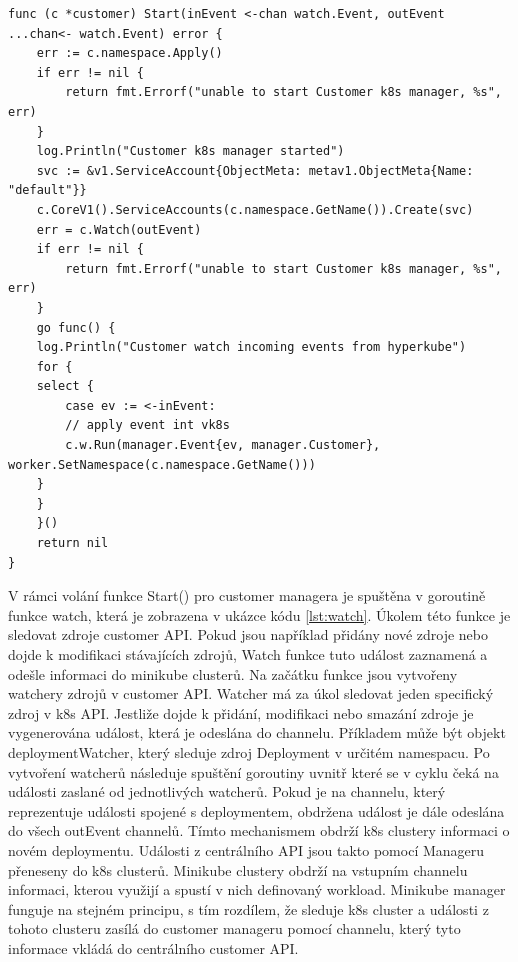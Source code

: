 \begin{lstlisting}[caption={funkce Start Customer managera},label=lst:customer]
func (c *customer) Start(inEvent <-chan watch.Event, outEvent ...chan<- watch.Event) error {
	err := c.namespace.Apply()
	if err != nil {
		return fmt.Errorf("unable to start Customer k8s manager, %s", err)
	}
	log.Println("Customer k8s manager started")
	svc := &v1.ServiceAccount{ObjectMeta: metav1.ObjectMeta{Name: "default"}}
	c.CoreV1().ServiceAccounts(c.namespace.GetName()).Create(svc)
	err = c.Watch(outEvent)
	if err != nil {
		return fmt.Errorf("unable to start Customer k8s manager, %s", err)
	}
	go func() {
	log.Println("Customer watch incoming events from hyperkube")
	for {
	select {
		case ev := <-inEvent:
		// apply event int vk8s
		c.w.Run(manager.Event{ev, manager.Customer}, worker.SetNamespace(c.namespace.GetName()))
	}
	}
	}()
	return nil
}
\end{lstlisting}
\par																																					    V rámci volání funkce Start() pro customer managera je spuštěna v goroutině funkce watch, která je zobrazena v ukázce kódu \ref{lst:watch}. Úkolem této funkce je sledovat zdroje customer API. Pokud jsou například přidány nové zdroje nebo dojde k modifikaci stávajících zdrojů, Watch funkce tuto událost zaznamená a odešle informaci do minikube clusterů. Na začátku funkce jsou vytvořeny watchery zdrojů v customer API. Watcher má za úkol sledovat jeden specifický zdroj v k8s API. Jestliže dojde k přidání, modifikaci nebo smazání zdroje je vygenerována událost, která je odeslána do channelu. Příkladem může být objekt deploymentWatcher, který sleduje zdroj Deployment \linebreak v určitém namespacu. Po vytvoření watcherů následuje spuštění goroutiny uvnitř které se v cyklu čeká na události zaslané od jednotlivých watcherů. Pokud je na channelu, který reprezentuje události spojené s deploymentem, obdržena událost je dále odeslána do všech outEvent channelů. Tímto mechanismem obdrží k8s clustery informaci o novém deploymentu. Události z centrálního API jsou takto pomocí Manageru přeneseny do k8s clusterů. Minikube clustery obdrží na vstupním channelu informaci, kterou využijí a spustí v nich definovaný workload. Minikube manager funguje na stejném principu, s tím rozdílem, že sleduje k8s cluster a události z tohoto clusteru zasílá do customer manageru pomocí channelu, který tyto informace vkládá do centrálního customer API. 
\pagebreak
